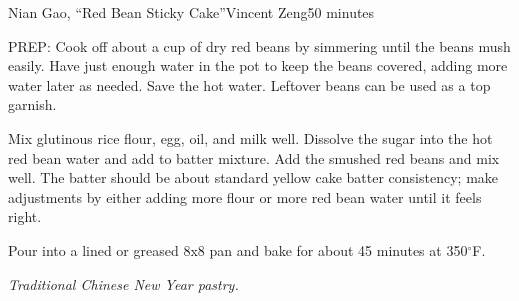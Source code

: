 \begin{recipe}{Nian Gao, ``Red Bean Sticky Cake''}{Vincent Zeng}{50 minutes}

  PREP: Cook off about a cup of dry red beans by simmering until the beans mush easily. Have just enough water in the pot to keep the beans covered, adding more water later as needed. Save the hot water. Leftover beans can be used as a top garnish.

  Mix glutinous rice flour, egg, oil, and milk well. Dissolve the sugar into the hot red bean water and add to batter mixture. Add the smushed red beans and mix well. The batter should be about standard yellow cake batter consistency; make adjustments by either adding more flour or more red bean water until it feels right.

  Pour into a lined or greased 8x8 pan and bake for about 45 minutes at 350$^{\circ}$F.
\end{recipe}
\textit{Traditional Chinese New Year pastry.}
